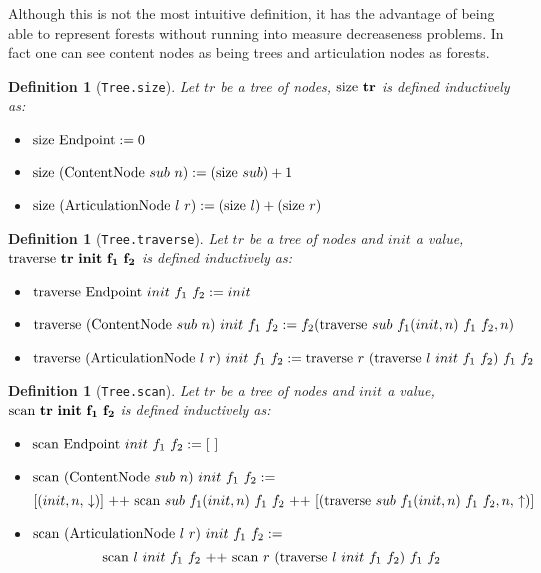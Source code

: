 \documentclass{article}
\newtheorem{definition}[lemma]{Definition}
\newcommand{\textfun}[1]{\textup{#1}}
\newcommand{\textcode}[1]{\texttt{#1}}
\newcommand{\bolddef}[1]{\textbf{\ensuremath{\mathbf{#1}}}}
\newcommand{\fone}[2]{\ensuremath{f_{1}(#1, #2)}}
\newcommand{\ftwo}[2]{\ensuremath{f_{2}(#1, #2)}}
\newcommand{\emptyList}{\ensuremath{[\ ]}}
\newcommand{\concat}{{{\ ++\ }}}
\newcommand{\nilNode}{\textfun{Endpoint}}
\newcommand{\contentNode}[2]{\textfun{ContentNode}\ #1\ #2}
\newcommand{\artNode}[2]{\textfun{ArticulationNode}\ #1\ #2}
\newcommand{\longtraverse}[4]{\textfun{traverse}\ #1\ #2\ #3 \ #4}
\newcommand{\longscan}[4]{\textfun{scan}\ #1\ #2\ #3 \ #4}
\newcommand{\up}{\uparrow}
\newcommand{\down}{\downarrow}
\newcommand{\size}[1]{\textfun{size}\ #1}
\begin{document}
Although this is not the most intuitive definition, it has the advantage of being able to represent forests 
without running into measure decreaseness problems. In fact one can see content nodes as being trees and articulation nodes as forests.


\begin{definition}[\textcode{Tree.size}]
    \label{size_def}
    Let $tr$ be a tree of nodes, \bolddef{\size{tr}} is defined inductively as:
    \begin{itemize}
        \item $\size{\nilNode} := 0$
        \item $\size{(\contentNode{sub}{n})} := (\size{sub}) + 1$
        \item $\size{(\artNode{l}{r})} := (\size{l}) + (\size{r})$
    \end{itemize}
\end{definition}

\begin{definition}[\textcode{Tree.traverse}]
    \label{traverse_def}
    Let $tr$ be a tree of nodes and $init$ a value, \bolddef{\longtraverse{tr}{init}{f_1}{f_2}} is defined inductively as:
    \begin{itemize}
        \item $\longtraverse{\nilNode}{init}{f_1}{f_2} := init$
        \item $\longtraverse{(\contentNode{sub}{n})}{init}{f_1}{f_2} := \ftwo{\longtraverse{sub}{\fone{init}{n}}{f_1}{f_2}}{n}$
        \item $\longtraverse{(\artNode{l}{r})}{init}{f_1}{f_2} := \longtraverse{r}{(\longtraverse{l}{init}{f_1}{f_2})}{f_1}{f_2}$
    \end{itemize}
\end{definition}

\begin{definition}[\textcode{Tree.scan}]
    \label{scan_def}
    Let $tr$ be a tree of nodes and $init$ a value, \bolddef{\longscan{tr}{init}{f_1}{f_2}} is defined inductively as:
    \begin{itemize}
        \item $\longscan{\nilNode}{init}{f_1}{f_2} := \emptyList$
        \item $\longscan{(\contentNode{sub}{n})}{init}{f_1}{f_2} :=$
        \[ [(init, n,\,\down)] \concat \longscan{sub}{f_1(init, n)}{f_1}{f_2} \concat [(\longtraverse{sub}{f_1(init, n)}{f_1}{f_2}, n,\,\up)]\]
        \item $\longscan{(\artNode{l}{r})}{init}{f_1}{f_2} :=$
        \[\longscan{l}{init}{f_1}{f_2} \concat \longscan{r}{(\longtraverse{l}{init}{f_1}{f_2})}{f_1}{f_2}\]
    \end{itemize}
\end{definition}
\end{document}
